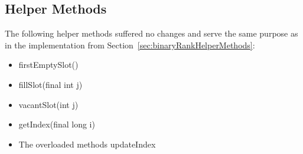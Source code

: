 \subsection{Helper Methods} \label{sec:dontCaresRankHelperMethods}

The following helper methods suffered no changes and serve the same purpose as in the implementation from Section~\ref{sec:binaryRankHelperMethods}:
\begin{itemize}
    \item
    {\ttfamily firstEmptySlot()}
    
    \item
    {\ttfamily fillSlot(final int j)}
    
    \item
    {\ttfamily vacantSlot(int j)}
    
    \item
    {\ttfamily getIndex(final long i)}
    
    \item
    The overloaded methods {\ttfamily updateIndex}
\end{itemize}

